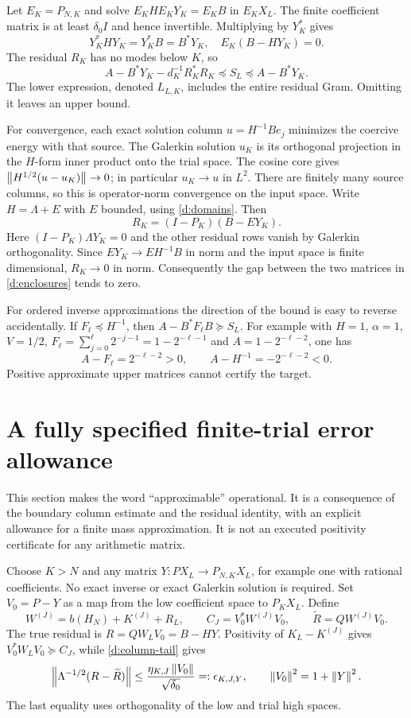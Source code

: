 Let $E_K=P_{N,K}$ and solve $E_KHE_KY_K=E_KB$ in $E_KX_L$.
The finite coefficient matrix is at least $\delta_0I$ and hence invertible.
Multiplying by $Y_K^*$ gives
\[
Y_K^*HY_K=Y_K^*B=B^*Y_K,
\quad E_K(B-HY_K)=0.
\]
The residual $R_K$ has no modes below $K$, so
\begin{equation}\label{d:enclosures}
A-B^*Y_K-d_K^{-1}R_K^*R_K
\preceq S_L\preceq A-B^*Y_K.
\end{equation}
The lower expression, denoted $L_{L,K}$, includes the entire residual
Gram. Omitting it leaves an upper bound.

For convergence, each exact solution column $u=H^{-1}Be_j$ minimizes
the coercive energy with that source. The Galerkin solution $u_K$ is its
orthogonal projection in the $H$-form inner product onto the trial space.
The cosine core gives $\left\lVert H^{1/2}(u-u_K)\right\rVert\to0$; in particular
$u_K\to u$ in $L^2$. There are finitely many source columns, so this is
operator-norm convergence on the input space.
Write $H=\Lambda+E$ with $E$ bounded, using \eqref{d:domains}. Then
\[
R_K=(I-P_K)(B-EY_K).
\]
Here $(I-P_K)\Lambda Y_K=0$ and the other residual rows vanish by
Galerkin orthogonality. Since $EY_K\to EH^{-1}B$ in norm and the input
space is finite dimensional, $R_K\to0$ in norm. Consequently the gap
between the two matrices in \eqref{d:enclosures} tends to zero.

For ordered inverse approximations the direction of the bound is easy
to reverse accidentally. If $F_\ell\preceq H^{-1}$, then
$A-B^*F_\ell B\succeq S_L$.
For example with $H=1$, $\alpha=1$, $V=1/2$,
$F_\ell=\sum_{j=0}^\ell 2^{-j-1}=1-2^{-\ell-1}$ and
$A=1-2^{-\ell-2}$, one has
\[
A-F_\ell=2^{-\ell-2}>0,\qquad A-H^{-1}=-2^{-\ell-2}<0.
\]
Positive approximate upper matrices cannot certify the target.

\section{A fully specified finite-trial error allowance}
This section makes the word ``approximable'' operational. It is a
consequence of the boundary column estimate and the residual identity,
with an explicit allowance for a finite mass approximation. It is not
an executed positivity certificate for any arithmetic matrix.

Choose $K>N$ and any matrix $Y:PX_L\to P_{N,K}X_L$, for example one
with rational coefficients. No exact inverse or exact Galerkin solution
is required. Set $V_0=P-Y$ as a map from the low coefficient space to
$P_KX_L$. Define
\[
W^{(J)}=b(H_N)+K^{(J)}+R_L,\qquad
C_J=V_0^*W^{(J)}V_0,\qquad\widetilde R=QW^{(J)}V_0.
\]
The true residual is $R=QW_LV_0=B-HY$. Positivity of $K_L-K^{(J)}$
gives $V_0^*W_LV_0\succeq C_J$, while \eqref{d:column-tail} gives
\begin{equation}\label{d:residual-error}
\left\lVert\Lambda^{-1/2}(R-\widetilde R)\right\rVert
\le\frac{\eta_{K,J}\left\lVert V_0\right\rVert}{\sqrt{\delta_0}}
=:\epsilon_{K,J,Y},\qquad\left\lVert V_0\right\rVert^2=1+\left\lVert Y\right\rVert^2.
\end{equation}
The last equality uses orthogonality of the low and trial high spaces.

